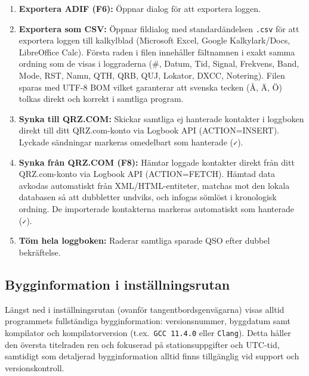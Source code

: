 \documentclass[11pt,a4paper]{article}
\begin{document}
\begin{enumerate}
    \item \textbf{Exportera ADIF (F6):} Öppnar dialog för att exportera loggen.
    \item \textbf{Exportera som CSV:} Öppnar fildialog med standardändelsen \texttt{.csv} för att exportera loggen till kalkylblad (Microsoft Excel, Google Kalkylark/Docs, LibreOffice Calc). Första raden i filen innehåller fältnamnen i exakt samma ordning som de visas i loggraderna (\#, Datum, Tid, Signal, Frekvens, Band, Mode, RST, Namn, QTH, QRB, QUJ, Lokator, DXCC, Notering). Filen sparas med UTF-8 BOM vilket garanterar att svenska tecken (Å, Ä, Ö) tolkas direkt och korrekt i samtliga program.
    \item \textbf{Synka till QRZ.COM:} Skickar samtliga ej hanterade kontakter i loggboken direkt till ditt QRZ.com-konto via Logbook API (ACTION=INSERT). Lyckade sändningar markeras omedelbart som hanterade (\texttt{✓}).
    \item \textbf{Synka från QRZ.COM (F8):} Hämtar loggade kontakter direkt från ditt QRZ.com-konto via Logbook API (ACTION=FETCH). Hämtad data avkodas automatiskt från XML/HTML-entiteter, matchas mot den lokala databasen så att dubbletter undviks, och infogas sömlöst i kronologisk ordning. De importerade kontakterna markeras automatiskt som hanterade (\texttt{✓}).
    \item \textbf{Töm hela loggboken:} Raderar samtliga sparade QSO efter dubbel bekräftelse.
\end{enumerate}

\subsection{Bygginformation i inställningsrutan}
\label{sec:build_info}
Längst ned i inställningsrutan (ovanför tangentbordsgenvägarna) visas alltid programmets fullständiga bygginformation: versionsnummer, byggdatum samt kompilator och kompilatorversion (t.ex.\ \texttt{GCC 11.4.0} eller \texttt{Clang}). Detta håller den översta titelraden ren och fokuserad på stationsuppgifter och UTC-tid, samtidigt som detaljerad bygginformation alltid finns tillgänglig vid support och versionskontroll.
\end{document}
